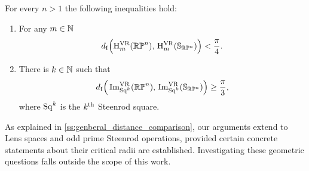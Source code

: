 \begin{introtheorem}\label{thm:inequalities intro}
	For every \(n > 1\) the following inequalities hold:
	\begin{enumerate}
		\item For any \(m \in \mathbb{N}\)
		\[
		d_{\mathrm{I}}\Big(\mathrm{H}^{\mathrm{VR}}_m(\mathbb{RP}^n),\, \mathrm{H}^{\mathrm{VR}}_m(\mathbb{S}_{\mathbb{RP}^n})\Big) < \frac{\pi}{4}.
		\]

		\item There is \(k \in \mathbb{N}\) such that
		\[
		d_{\mathrm{I}}\Big(\operatorname{Im}_{\mathrm{Sq}^k}^{\mathrm{VR}}(\mathbb{RP}^n),\, \operatorname{Im}_{\mathrm{Sq}^k}^{\mathrm{VR}}(\mathbb{S}_{\mathbb{RP}^n})\Big) \geq \frac{\pi}{3},
		\]
		where \(\mathrm{Sq}^k\) is the \(k^{\mathrm{th}}\) Steenrod square.
	\end{enumerate}
\end{introtheorem}

\medskip As explained in \cref{ss:genberal_distance_comparison}, our arguments extend to Lens spaces and odd prime Steenrod operations, provided certain concrete statements about their critical radii are established.
Investigating these geometric questions falls outside the scope of this work.
